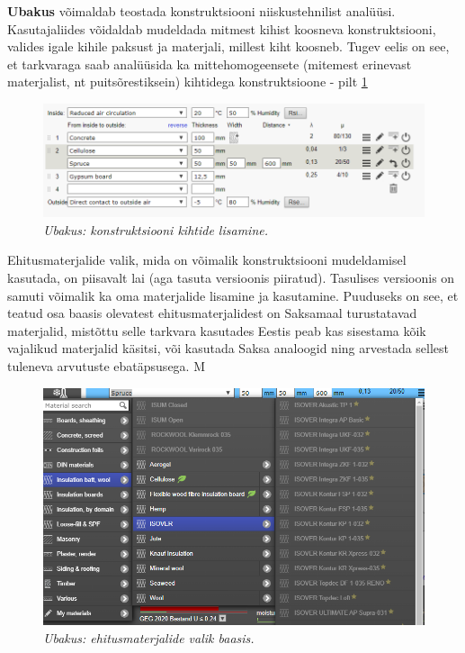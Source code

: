 \textbf{Ubakus} võimaldab teostada konstruktsiooni niiskustehnilist analüüsi. Kasutajaliides võidaldab mudeldada mitmest kihist koosneva konstruktsiooni,
valides igale kihile paksust ja materjali, millest kiht koosneb. Tugev eelis on see, et tarkvaraga saab analüüsida ka mittehomogeensete (mitemest erinevast 
materjalist, nt puitsõrestiksein) kihtidega konstruktsioone - pilt \ref{fig:ubakus_layers}

\begin{figure}[ht]
    \centering
    \includegraphics[width=.6\textwidth]{figures/01_analogues/02_ubakus_layers.png}
    \caption{\textit{Ubakus: konstruktsiooni kihtide lisamine.}}
    \label{fig:ubakus_layers}
\end{figure}

Ehitusmaterjalide valik, mida on võimalik konstruktsiooni mudeldamisel kasutada, on piisavalt lai (aga tasuta versioonis piiratud). 
Tasulises versioonis on samuti võimalik ka oma materjalide lisamine ja kasutamine. Puuduseks on see, et teatud osa baasis olevatest ehitusmaterjalidest on Saksamaal
turustatavad materjalid, mistõttu selle tarkvara kasutades Eestis peab kas sisestama kõik vajalikud materjalid käsitsi, või kasutada Saksa analoogid ning arvestada sellest tuleneva
arvutuste ebatäpsusega. M
\begin{figure}[ht]
    \centering
    \includegraphics[width=.6\textwidth]{figures/01_analogues/03_ubakus_materials.png}
    \caption{\textit{Ubakus: ehitusmaterjalide valik baasis.}}
    \label{fig:ubakus_materials}
\end{figure}
